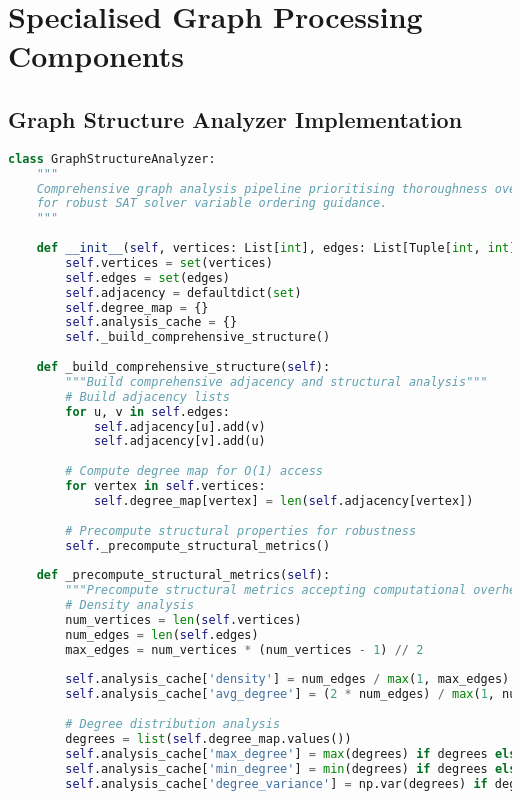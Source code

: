 \section{Specialised Graph Processing Components}
\label{appendix:graph-processing}

\subsection{Graph Structure Analyzer Implementation}
\label{appendix:graph-structure}

\begin{lstlisting}[language=Python, caption=Comprehensive Graph Structure Analysis Pipeline]
class GraphStructureAnalyzer:
    """
    Comprehensive graph analysis pipeline prioritising thoroughness over speed
    for robust SAT solver variable ordering guidance.
    """
    
    def __init__(self, vertices: List[int], edges: List[Tuple[int, int]]):
        self.vertices = set(vertices)
        self.edges = set(edges)
        self.adjacency = defaultdict(set)
        self.degree_map = {}
        self.analysis_cache = {}
        self._build_comprehensive_structure()
    
    def _build_comprehensive_structure(self):
        """Build comprehensive adjacency and structural analysis"""
        # Build adjacency lists
        for u, v in self.edges:
            self.adjacency[u].add(v)
            self.adjacency[v].add(u)
        
        # Compute degree map for O(1) access
        for vertex in self.vertices:
            self.degree_map[vertex] = len(self.adjacency[vertex])
        
        # Precompute structural properties for robustness
        self._precompute_structural_metrics()
    
    def _precompute_structural_metrics(self):
        """Precompute structural metrics accepting computational overhead"""
        # Density analysis
        num_vertices = len(self.vertices)
        num_edges = len(self.edges)
        max_edges = num_vertices * (num_vertices - 1) // 2
        
        self.analysis_cache['density'] = num_edges / max(1, max_edges)
        self.analysis_cache['avg_degree'] = (2 * num_edges) / max(1, num_vertices)
        
        # Degree distribution analysis
        degrees = list(self.degree_map.values())
        self.analysis_cache['max_degree'] = max(degrees) if degrees else 0
        self.analysis_cache['min_degree'] = min(degrees) if degrees else 0
        self.analysis_cache['degree_variance'] = np.var(degrees) if degrees else 0
    

\end{lstlisting}
